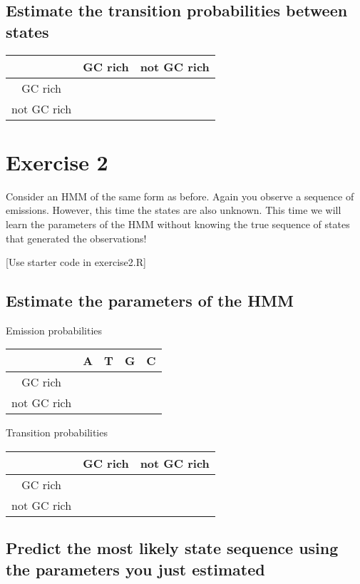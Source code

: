 \documentclass[11pt, oneside]{article}
\begin{document}
\subsection{Estimate the transition probabilities between states}
\begin{table}[H]
\centering
\begin{tabular}{|c|c|c|}
\hline
& GC rich & not GC rich \\\hline
GC rich & &  \\\hline
not GC rich & &  \\\hline
\end{tabular}
\end{table}

\section{Exercise 2}
Consider an HMM of the same form as before. 
Again you observe a sequence of emissions. 
However, this time the states are also unknown. 
This time we will learn the parameters of the HMM without knowing the true sequence of states that generated the observations! 

[Use starter code in exercise2.R]

\subsection{Estimate the parameters of the HMM}
Emission probabilities
\begin{table}[H]
\centering
\begin{tabular}{|c|c|c|c|c|}
\hline
& A & T & G & C \\\hline
GC rich & & & &  \\\hline
not GC rich & & & & \\\hline
\end{tabular}
\end{table}

Transition probabilities
\begin{table}[H]
\centering
\begin{tabular}{|c|c|c|}
\hline
& GC rich & not GC rich \\\hline
GC rich & &  \\\hline
not GC rich & &  \\\hline
\end{tabular}
\end{table}

\subsection{Predict the most likely state sequence using the parameters you just estimated}
\end{document}
